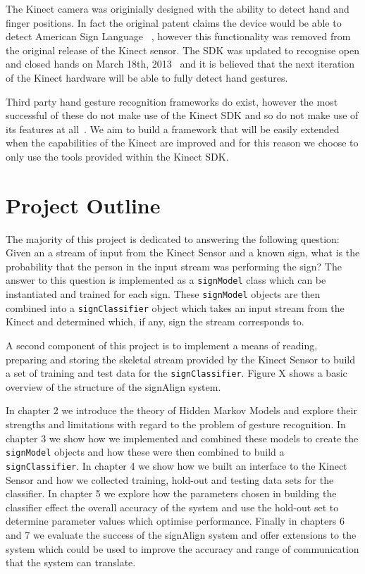 The Kinect camera was originially designed with the ability to detect hand and finger positions. In fact the original patent claims the device would be able to detect American Sign Language ~\citep{LATTA:2010:biblatex}, however this functionality was removed from the original release of the Kinect sensor. The SDK was updated to recognise open and closed hands on March 18th, 2013~\citep{Microsoft:2013:Online} and it is believed that the next iteration of the Kinect hardware will be able to fully detect hand gestures.

Third party hand gesture recognition frameworks do exist, however the most successful of these do not make use of the Kinect SDK and so do not make use of its features at all~\citep{Forth:2013:Online}. We aim to build a framework that will be easily extended when the capabilities of the Kinect are improved and for this reason we choose to only use the tools provided within the Kinect SDK.

\section{Project Outline}
The majority of this project is dedicated to answering the following question: Given an a stream of input from the Kinect Sensor and a known sign, what is the probability that the person in the input stream was performing the sign? The answer to this question is implemented as a \verb|signModel| class which can be instantiated and trained for each sign. These \verb|signModel| objects are then combined into a \verb|signClassifier| object which takes an input stream from the Kinect and determined which, if any, sign the stream corresponds to.

A second component of this project is to implement a means of reading, preparing and storing the skeletal stream provided by the Kinect Sensor to build a set of training and test data for the \verb|signClassifier|. Figure X shows a basic overview of the structure of the signAlign system.

In chapter 2 we introduce the theory of Hidden Markov Models and explore their strengths and limitations with regard to the problem of gesture recognition. In chapter 3 we show how we implemented and combined these models to create the \verb|signModel| objects and how these were then combined to build a \verb|signClassifier|. In chapter 4 we show how we built an interface to the Kinect Sensor and how we collected training, hold-out and testing data sets for the classifier. In chapter 5 we explore how the parameters chosen in building the classifier effect the overall accuracy of the system and use the hold-out set to determine parameter values which optimise performance. Finally in chapters 6 and 7 we evaluate the success of the signAlign system and offer extensions to the system which could be used to improve the accuracy and range of communication that the system can translate.




